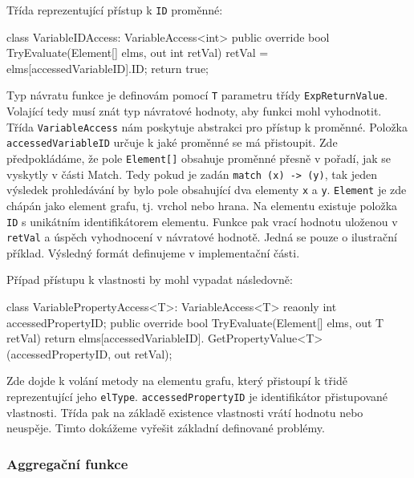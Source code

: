 Třída reprezentující přístup k \verb+ID+ proměnné:
\begin{code}
class VariableIDAccess: VariableAccess<int> {
  public override bool TryEvaluate(Element[] elms, out int retVal) {
     retVal = elms[accessedVariableID].ID;
     return true; } }
\end{code}
Typ návratu funkce je definovám pomocí \texttt{T} parametru třídy \texttt{ExpReturnValue}.
Volající tedy musí znát typ návratové hodnoty, aby funkci mohl vyhodnotit.
Třída \verb+VariableAccess+ nám poskytuje abstrakci pro přístup k proměnné.
Položka \verb+accessedVariableID+ určuje k jaké proměnné se má přistoupit.
Zde předpokládáme, že pole \verb+Element[]+ obsahuje proměnné přesně v pořadí, jak se vyskytly v části Match.
Tedy pokud je zadán \texttt{match (x) -> (y)}, tak jeden výsledek prohledávání by bylo pole obsahující dva elementy \texttt{x} a \texttt{y}.
\texttt{Element} je zde chápán jako element grafu, tj. vrchol nebo hrana.
Na elementu existuje položka \texttt{ID} s unikátním identifikátorem elementu.
Funkce pak vrací hodnotu uloženou v \texttt{retVal} a úspěch vyhodnocení v návratové hodnotě. 
Jedná se pouze o ilustrační příklad. 
Výsledný formát definujeme v implementační části.

Případ přístupu k vlastnosti by mohl vypadat následovně:
\begin{code}
class VariablePropertyAccess<T>: VariableAccess<T> {
  reaonly int accessedPropertyID; 
  public override bool TryEvaluate(Element[] elms, out T retVal) {
    return elms[accessedVariableID].
               GetPropertyValue<T>(accessedPropertyID, out retVal);
  }
}
\end{code}
Zde dojde k volání metody na elementu grafu, který přistoupí k třidě reprezentující jeho \verb+elType+.
\texttt{accessedPropertyID} je identifikátor přistupované vlastnosti.
Třída pak na základě existence vlastnosti vrátí hodnotu nebo neuspěje.
Timto dokážeme vyřešit základní definované problémy.

\subsubsection{Aggregační funkce}

